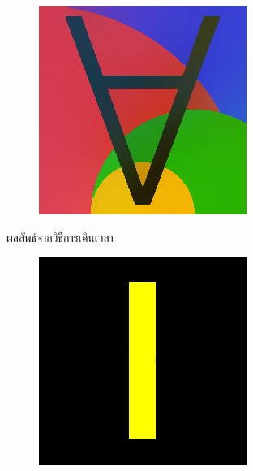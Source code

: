 \documentclass[hidelinks, a4paper,12pt]{article}
\numberwithin{equation}{section}							%
\numberwithin{equation}{section}
\begin{document}
{\begin{figure}[H]
\begin{subfigure}{0.4\linewidth}
			\includegraphics[width=0.8\linewidth]{images/result_ex1/timemarch05.png}			
		\end{subfigure}
		\caption{ผลลัพธ์จากวิธีการเดินเวลา}
	\end{figure}
\begin{figure}[H]
	\centering
	\begin{subfigure}{0.4\linewidth}
		\centering
		\includegraphics[width=0.8\linewidth]{images/result_ex1/fixpoint01.png}
	\end{subfigure}
	\begin{subfigure}{0.4\linewidth}
		\centering

\end{subfigure}
\end{figure}}
\end{document}
